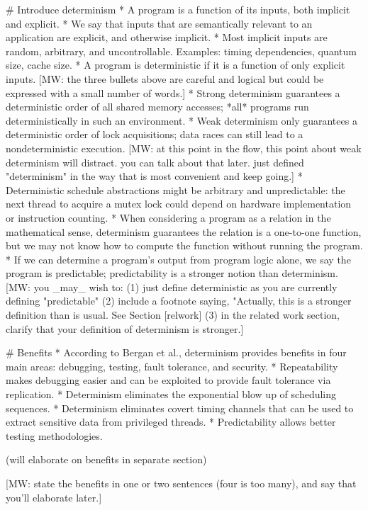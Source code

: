 \iffalse
# Introduce determinism
* A program is a function of its inputs, both implicit and explicit.
* We say that inputs that are semantically relevant to an application are
  explicit, and otherwise implicit.
* Most implicit inputs are random, arbitrary, and uncontrollable. Examples:
  timing dependencies, quantum size, cache size.
* A program is deterministic if it is a function of only explicit inputs.
[MW: the three bullets above are careful and logical but could be
expressed with a small number of words.]
* Strong determinism guarantees a deterministic order of all shared memory
  accesses; *all* programs run deterministically in such an environment.
* Weak determinism only guarantees a deterministic order of lock acquisitions;
  data races can still lead to a nondeterministic execution.
[MW: at this point in the flow, this point about weak determinism will
distract. you can talk about that later. just defined "determinism" in
the way that is most convenient and keep going.]
* Deterministic schedule abstractions might be arbitrary and unpredictable: the
  next thread to acquire a mutex lock could depend on hardware implementation or
  instruction counting.
* When considering a program as a relation in the mathematical sense,
  determinism guarantees the relation is a one-to-one function, but we may not
  know how to compute the function without running the program.
* If we can determine a program's output from program logic alone, we say the
  program is predictable; predictability is a stronger notion than determinism.
[MW: you _may_ wish to: (1) just define deterministic as you are currently
defining "predictable" (2) include a footnote saying, "Actually, this is
a stronger definition than is usual. See Section [relwork] (3) in the
related work section, clarify that your definition of determinism is
stronger.]

# Benefits
* According to Bergan et al., determinism provides benefits in four main areas:
  debugging, testing, fault tolerance, and security.
* Repeatability makes debugging easier and can be exploited to provide fault
  tolerance via replication.
* Determinism eliminates the exponential blow up of scheduling sequences.
* Determinism eliminates covert timing channels that can be used to extract
  sensitive data from privileged threads.
* Predictability allows better testing methodologies.

(will elaborate on benefits in separate section)

[MW: state the benefits in one or two sentences (four is too many), and
say that you'll elaborate later.]

